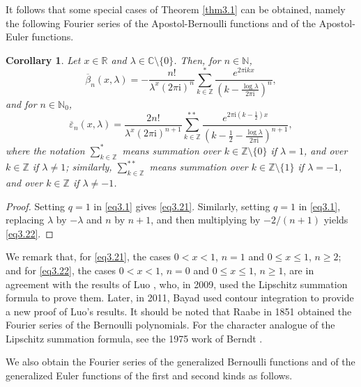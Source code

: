 \documentclass[reqno]{amsart}
\numberwithin{equation}{section}
\newtheorem{corollary}[thm]{Corollary}
\begin{document}
It follows that some special cases of Theorem \ref{thm3.1} can be obtained, namely the following Fourier series of the Apostol-Bernoulli functions and of the Apostol-Euler functions.

\begin{corollary}\label{cor3.2} Let $x\in\mathbb{R}$ and $\lambda\in\mathbb{C}\setminus\{0\}$. Then, for $n\in\mathbb{N}$,
\begin{equation}\label{eq3.21}
\overline{\beta}_{n}(x,\lambda)=-\frac{n!}{\lambda^{x}(2\pi \mathrm{i})^{n}}\sum_{k\in\mathbb{Z}}^{*}\frac{e^{2\pi\mathrm{i}kx}}{(k-\frac{\log\lambda}{2\pi\mathrm{i}})^{n}},
\end{equation}
and for $n\in\mathbb{N}_{0}$,
\begin{equation}\label{eq3.22}
\overline{\varepsilon}_{n}(x,\lambda)=\frac{2n!}{\lambda^{x}(2\pi \mathrm{i})^{n+1}}\sum_{k\in\mathbb{Z}}^{**}\frac{e^{2\pi\mathrm{i}(k-\frac{1}{2})x}}{(k-\frac{1}{2}-\frac{\log\lambda}{2\pi\mathrm{i}})^{n+1}},
\end{equation}
where the notation $\sum_{k\in\mathbb{Z}}^{*}$ means summation over $k\in\mathbb{Z}\setminus\{0\}$ if $\lambda=1$, and over $k\in\mathbb{Z}$ if $\lambda\neq1$; similarly, $\sum_{k\in\mathbb{Z}}^{**}$ means summation over $k\in\mathbb{Z}\setminus\{1\}$ if $\lambda=-1$, and over $k\in\mathbb{Z}$ if $\lambda\neq-1$.
\end{corollary}

\begin{proof}
Setting $q=1$ in \eqref{eq3.1} gives \eqref{eq3.21}. Similarly, setting $q=1$ in \eqref{eq3.1}, replacing $\lambda$ by $-\lambda$ and $n$ by $n+1$, and then multiplying by
$-2/(n+1)$ yields \eqref{eq3.22}.
\end{proof}

We remark that, for \eqref{eq3.21}, the cases $0<x<1$, $n=1$ and $0\leqslant x\leqslant 1$, $n\geqslant2$; and for \eqref{eq3.22}, the cases $0<x<1$, $n=0$ and $0\leqslant x\leqslant 1$, $n\geqslant1$, are in agreement with the results of Luo \cite{luo1}, who, in 2009, used the Lipschitz summation formula \cite{lipschitz} to prove them. Later, in 2011, Bayad \cite{bayad2} used contour integration to provide a new proof of Luo's results. It should be noted that Raabe \cite{raabe} in 1851 obtained the Fourier series of the Bernoulli polynomials. For the character analogue of the Lipschitz summation formula, see the 1975 work of Berndt \cite{berndt3}.

We also obtain the Fourier series of the generalized Bernoulli functions and of the generalized Euler functions of the first and second kinds as follows.
\end{document}

